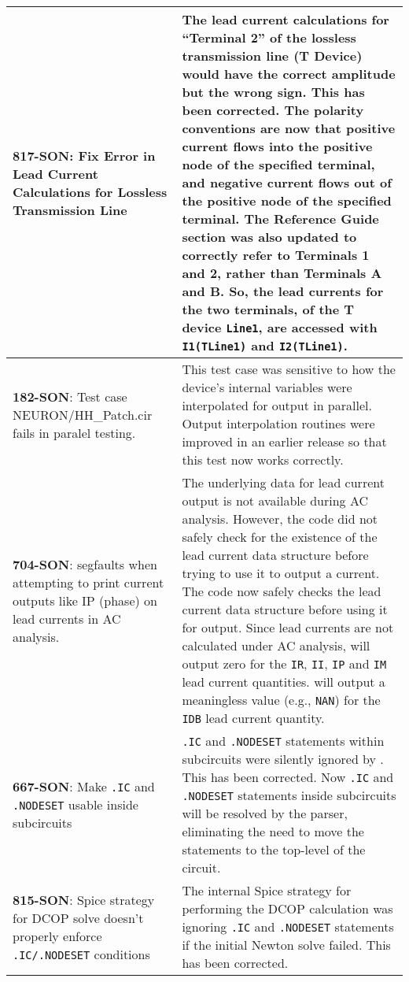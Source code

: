 {\begin{longtable}[h] {>{\raggedright\small}m{2in}|>{\raggedright\let\\\tabularnewline\small}m{3.5in}}
     \textbf{817-SON}: Fix Error in Lead Current Calculations for Lossless Transmission Line &
     The lead current calculations for ``Terminal 2'' of the lossless transmission line (T Device) 
     would have the correct amplitude but the wrong sign. This has been corrected.  
     The polarity conventions are now that positive current flows into the positive node 
     of the specified terminal, and negative current flows out of the positive node of the specified
     terminal.  The Reference Guide section was also updated to correctly refer to Terminals 1
     and 2, rather than Terminals A and B.  So, the lead currents for the two terminals, of the T device
     \texttt{Line1}, are accessed with \texttt{I1(TLine1)} and \texttt{I2(TLine1)}. \\ \hline

     \textbf{182-SON}: Test case NEURON/HH\_Patch.cir fails in paralel testing. &
     This test case was sensitive to how the device's internal variables were 
     interpolated for output in parallel.  Output interpolation routines were improved 
     in an earlier \Xyce{} release so that this test now works correctly. \\ \hline

     \textbf{704-SON}: \Xyce{} segfaults when attempting to print current outputs like IP (phase) on lead currents in AC analysis. &
     The underlying data for lead current output is not available during AC analysis.  However, the code did
     not safely check for the existence of the lead current data structure before trying to use it to output a current.
     The code now safely checks the lead current data structure before using it for output.  Since lead currents are not 
     calculated under AC analysis, \Xyce{} will output zero for the \texttt{IR}, \texttt{II}, \texttt{IP} and \texttt{IM}
     lead current quantities. \Xyce{} will output a meaningless value (e.g., \texttt{NAN}) for the \texttt{IDB} lead current quantity. \\ \hline

     \textbf{667-SON}: Make \texttt{.IC} and \texttt{.NODESET} usable inside subcircuits &
     \texttt{.IC} and \texttt{.NODESET} statements within subcircuits were silently ignored by \Xyce{}. 
     This has been corrected. Now \texttt{.IC} and \texttt{.NODESET} statements inside subcircuits will be
     resolved by the parser, eliminating the need to move the statements to the top-level of the
     circuit. \\ \hline

     \textbf{815-SON}: Spice strategy for DCOP solve doesn't properly enforce \texttt{.IC/.NODESET} conditions &
     The internal Spice strategy for performing the DCOP calculation was ignoring \texttt{.IC} and \texttt{.NODESET}
     statements if the initial Newton solve failed.  This has been corrected. \\ \hline


\end{longtable}}
